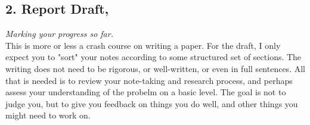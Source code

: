 \documentclass[12pt]{article}
\begin{document}
\newpage

\subsection{2. Report Draft,}\label{deliverable-2} \hfill \emph{Marking your progress so far.}\\

\noindent
This is more or less a crash course on writing a paper. For the draft, I only expect you to "sort" your notes according to some structured set of sections. The writing does not need to be rigorous, or well-written, or even in full sentences. All that is needed is to review your note-taking and research process, and perhaps assess your understanding of the probelm on a basic level. The goal is not to judge you, but to give you feedback on things you do well, and other things you might need to work on.
\end{document}
